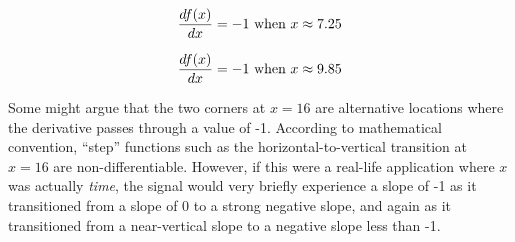 $${df(x) \over dx} = -1 \hbox{ when } x \approx 7.25$$

$${df(x) \over dx} = -1 \hbox{ when } x \approx 9.85$$

Some might argue that the two corners at $x=16$ are alternative locations where the derivative passes through a value of -1.  According to mathematical convention, ``step'' functions such as the horizontal-to-vertical transition at $x=16$ are non-differentiable.  However, if this were a real-life application where $x$ was actually {\it time}, the signal would very briefly experience a slope of -1 as it transitioned from a slope of 0 to a strong negative slope, and again as it transitioned from a near-vertical slope to a negative slope less than -1.




